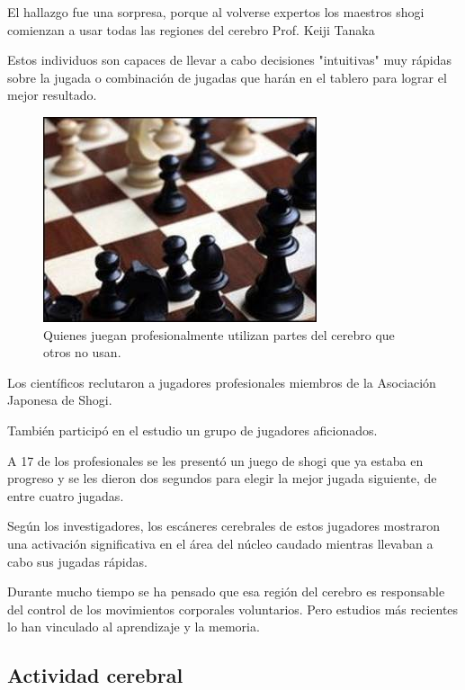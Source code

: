 \documentclass[12pt,a4paper]{article}
\begin{document}
\begin{flushright}
El hallazgo fue una sorpresa, porque al volverse expertos los maestros shogi comienzan a usar todas las regiones del cerebro
Prof. Keiji Tanaka
\end{flushright}

Estos individuos son capaces de llevar a cabo decisiones "intuitivas" muy rápidas sobre la jugada o combinación de jugadas que harán en el tablero para lograr el mejor resultado.

\begin{figure}[H]
	\centering
	\includegraphics[scale=0.5]{fig2}
	\caption{Quienes juegan profesionalmente utilizan partes del cerebro que otros no usan.}\label{fig:2}
\end{figure}

Los científicos reclutaron a jugadores profesionales miembros de la Asociación Japonesa de Shogi.

También participó en el estudio un grupo de jugadores aficionados.

A 17 de los profesionales se les presentó un juego de shogi que ya estaba en progreso y se les dieron dos segundos para elegir la mejor jugada siguiente, de entre cuatro jugadas.

{\Large Según los investigadores, los escáneres cerebrales de estos jugadores mostraron una activación significativa en el área del núcleo caudado mientras llevaban a cabo sus jugadas rápidas.}

Durante mucho tiempo se ha pensado que esa región del cerebro es responsable del control de los movimientos corporales voluntarios. Pero estudios más recientes lo han vinculado al aprendizaje y la memoria.

\subsection{Actividad cerebral}
\end{document}
